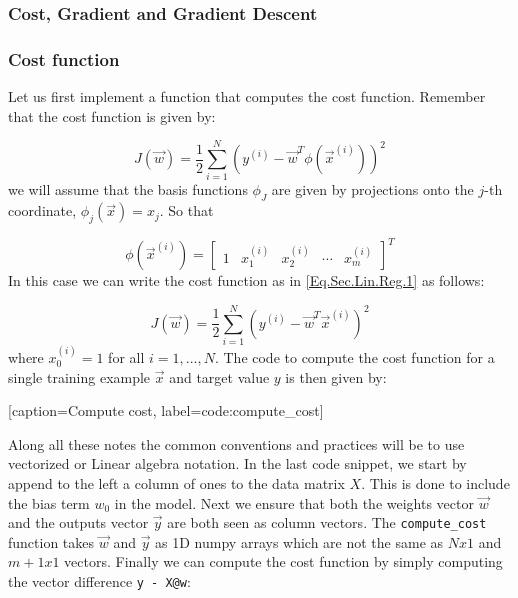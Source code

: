 \subsubsection{Cost, Gradient and Gradient Descent}

\subsubsection*{Cost function}
Let us first implement a function that computes the cost function. Remember that the cost function is given by:	

\begin{equation}\label{Eq.Sec.Lin.Reg.7}
	J(\vec{w}) = \frac{1}{2}\sum_{i=1}^{N} (y^{(i)} - \vec{w}^T\phi(\vec{x}^{(i)}) )^2
\end{equation}	
we will assume that the basis functions $\phi_J$ are given by projections onto the $j$-th coordinate, \ie $\phi_j(\vec{x}) = x_j$. So that 

\[ \phi(\vec{x}^{(i)}) = \begin{bmatrix}
    1 & x_1^{(i)} & x_2^{(i)} & \cdots & x_m^{(i)}
\end{bmatrix}^{T} \]
In this case we can write the cost function as in \cref{Eq.Sec.Lin.Reg.1} as follows:

\begin{equation}\label{Eq.Sec.Lin.Reg.8}
	J(\vec{w}) = \frac{1}{2}\sum_{i=1}^{N} (y^{(i)} - \vec{w}^T \vec{x}^{(i)})^2
\end{equation}
where $x_0^{(i)}=1$ for all $i=1,...,N$. The code to compute the cost function for a single training example $\vec{x}$ and target value $y$ is then given by: 

[caption={Compute cost}, label={code:compute_cost}]

Along all these notes the common conventions and practices will be to use vectorized or Linear algebra notation. In the last code snippet, we start by append to the left a column of ones to the data matrix $X$. This is done to include the bias term $w_0$ in the model. Next we ensure that both the weights vector $\vec{w}$ and the outputs vector $\vec{y}$ are both seen as column vectors. The \texttt{{compute\_cost}} function takes $\vec{w}$ and $\vec{y}$ as 1D numpy arrays which are not the same as $Nx1$ and $m+1 x 1$ vectors. Finally we can compute the cost function by simply computing the vector difference \texttt{y - X@w}: 

